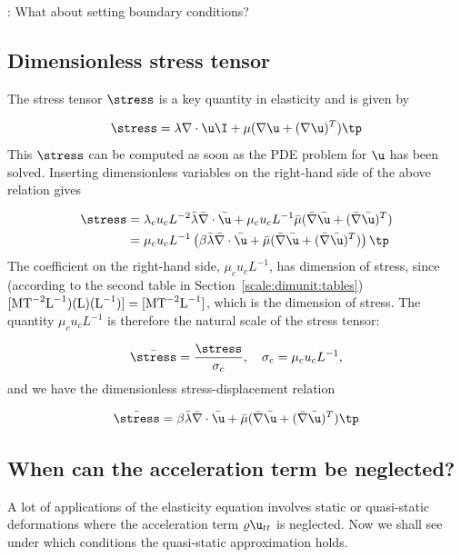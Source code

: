 \documentclass[graybox,envcountchap,sectrefs,final]{svmonodo}
\newcommand{\shortinlinecomment}[3]{{\color{red}{\bf #1}: #2}}
\begin{document}
\shortinlinecomment{hpl 19}{ What about setting boundary conditions? }{ What about setting boundary }

\subsection{Dimensionless stress tensor}
\label{scale:elasticity:PDE1:stress}

The stress tensor $\stress$ is a key quantity in elasticity and is given by

\[ \stress = \lambda\nabla\cdot\u\I + \mu(\nabla\u + (\nabla\u)^T)\tp\]
This $\stress$ can be computed as soon as the PDE problem for $\u$
has been solved.
Inserting dimensionless variables on the right-hand side of the above
relation gives

\begin{align*}
\stress &= \lambda_cu_cL^{-2}\bar\lambda\bar\nabla\cdot\bar\u
+ \mu_cu_cL^{-1}\bar\mu(\bar\nabla\bar\u + (\bar\nabla\bar\u)^T)\\ 
&= \mu_c u_cL^{-1}\left(\beta\bar\lambda\bar\nabla\cdot\bar\u +
\bar\mu(\bar\nabla\bar\u + (\bar\nabla\bar\u)^T)\right)\tp
\end{align*}
The coefficient on the right-hand side, $\mu_c u_cL^{-1}$, has dimension
of stress, since (according to the second table in
Section~\ref{scale:dimunit:tables}) $[\hbox{M}\hbox{T}^{-2}\hbox{L}^{-1})(\hbox{L})(\hbox{L}^{-1})]
=[\hbox{M}\hbox{T}^{-2}\hbox{L}^{-1}]$, which is the dimension of stress.
The quantity $\mu_c u_cL^{-1}$ is therefore the natural scale of the
stress tensor:

\[ \bar\stress = \frac{\stress}{\sigma_c},\quad \sigma_c = \mu_c u_c L^{-1},\]
and we have the dimensionless stress-displacement relation

\begin{equation}
\bar\stress =
\beta\bar\lambda\bar\nabla\cdot\bar\u +
\bar\mu(\bar\nabla\bar\u + (\bar\nabla\bar\u)^T)\tp
\end{equation}

\subsection{When can the acceleration term be neglected?}
\label{scale:elasticity:waves}

A lot of applications of the elasticity equation involves static or
quasi-static deformations where the acceleration term
$\varrho\u_{tt}$ is neglected. Now we shall see under which conditions
the quasi-static approximation holds.
\end{document}

